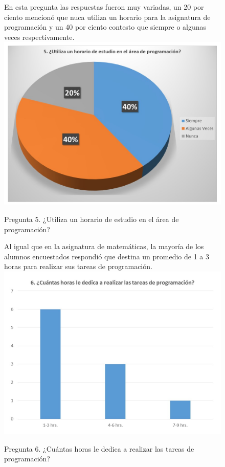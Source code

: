 \documentclass[12pt] {report}
\begin{document}
\begin{figure}[H]
\centering
En esta pregunta las respuestas fueron muy variadas, un 20 por ciento mencionó que nuca utiliza un horario para la asignatura de programación y un 40 por ciento contesto que siempre o algunas veces respectivamente.  
\includegraphics[scale=.7]{pregunta5.JPG}
\caption{Pregunta 5. ¿Utiliza un horario de estudio en el área de programación?}
\end{figure}
\begin{figure}[H]
\centering
Al igual que en la asignatura de matemáticas, la mayoría de los alumnos encuestados respondió que destina un promedio de 1 a 3 horas para realizar sus tareas de programación.  
\includegraphics[scale=.7]{pregunta6.JPG}
\caption{Pregunta 6. ¿Cuántas horas le dedica a realizar las tareas de programación?}
\end{figure}
\end{document}
